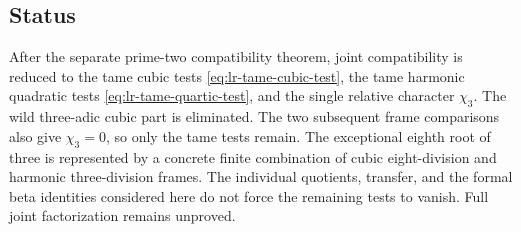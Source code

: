\subsection{Status}

After the separate prime-two compatibility theorem, joint
compatibility is reduced to the tame cubic tests
\eqref{eq:lr-tame-cubic-test}, the tame harmonic quadratic
tests \eqref{eq:lr-tame-quartic-test}, and the single relative
character $\chi_3$. The wild three-adic cubic part is eliminated.
The two subsequent frame comparisons also give $\chi_3=0$,
so only the tame tests remain.
The exceptional eighth root of three is represented by a
concrete finite combination of cubic eight-division and
harmonic three-division frames. The individual quotients,
transfer, and the formal beta identities considered here do
not force the remaining tests to vanish. Full joint
factorization remains unproved.
